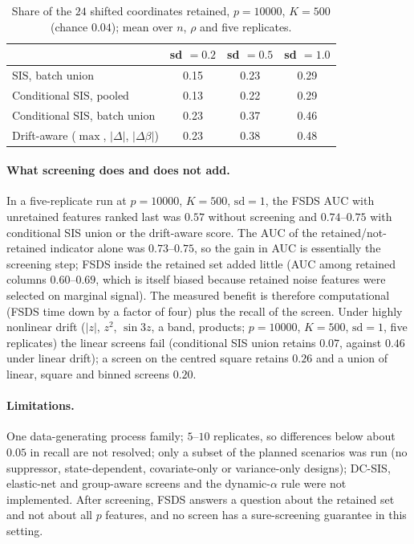\begin{table}[h]
\centering
\caption{Share of the $24$ shifted coordinates retained, $p=10000$, $K=500$ (chance $0.04$); mean over $n$, $\rho$ and five replicates.}
\label{tab:screen_recall}
\begin{tabular}{lccc}
\toprule
 & sd $=0.2$ & sd $=0.5$ & sd $=1.0$ \\
\midrule
SIS, batch union       & 0.15 & 0.23 & 0.29 \\
Conditional SIS, pooled & 0.13 & 0.22 & 0.29 \\
Conditional SIS, batch union & 0.23 & 0.37 & 0.46 \\
Drift-aware ($\max$, $|\Delta|$, $|\Delta\beta|$) & 0.23 & 0.38 & 0.48 \\
\bottomrule
\end{tabular}
\end{table}

\paragraph{What screening does and does not add.}
In a five-replicate run at $p=10000$, $K=500$, $\mathrm{sd}=1$, the FSDS AUC with unretained features ranked last was $0.57$ without screening and $0.74$--$0.75$ with conditional SIS union or the drift-aware score. The AUC of the retained/not-retained indicator alone was $0.73$--$0.75$, so the gain in AUC is essentially the screening step; FSDS inside the retained set added little (AUC among retained columns $0.60$--$0.69$, which is itself biased because retained noise features were selected on marginal signal). The measured benefit is therefore computational (FSDS time down by a factor of four) plus the recall of the screen. Under highly nonlinear drift ($|z|$, $z^2$, $\sin 3z$, a band, products; $p=10000$, $K=500$, $\mathrm{sd}=1$, five replicates) the linear screens fail (conditional SIS union retains $0.07$, against $0.46$ under linear drift); a screen on the centred square retains $0.26$ and a union of linear, square and binned screens $0.20$.

\paragraph{Limitations.}
One data-generating process family; $5$--$10$ replicates, so differences below about $0.05$ in recall are not resolved; only a subset of the planned scenarios was run (no suppressor, state-dependent, covariate-only or variance-only designs); DC-SIS, elastic-net and group-aware screens and the dynamic-$\alpha$ rule were not implemented. After screening, FSDS answers a question about the retained set and not about all $p$ features, and no screen has a sure-screening guarantee in this setting.
